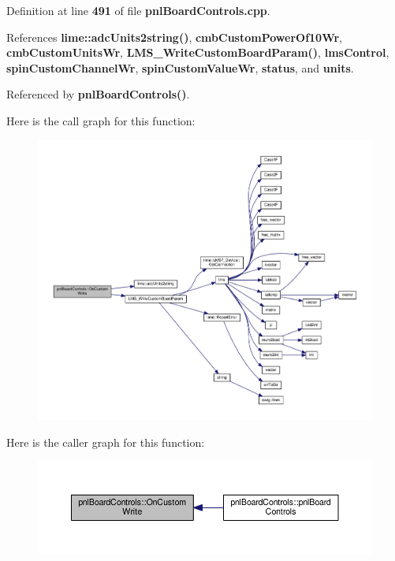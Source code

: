 Definition at line {\bf 491} of file {\bf pnl\+Board\+Controls.\+cpp}.



References {\bf lime\+::adc\+Units2string()}, {\bf cmb\+Custom\+Power\+Of10\+Wr}, {\bf cmb\+Custom\+Units\+Wr}, {\bf L\+M\+S\+\_\+\+Write\+Custom\+Board\+Param()}, {\bf lms\+Control}, {\bf spin\+Custom\+Channel\+Wr}, {\bf spin\+Custom\+Value\+Wr}, {\bf status}, and {\bf units}.



Referenced by {\bf pnl\+Board\+Controls()}.



Here is the call graph for this function\+:
\nopagebreak
\begin{figure}[H]
\begin{center}
\leavevmode
\includegraphics[width=350pt]{df/d93/classpnlBoardControls_a9218d64988342d65ec986628f2510965_cgraph}
\end{center}
\end{figure}




Here is the caller graph for this function\+:
\nopagebreak
\begin{figure}[H]
\begin{center}
\leavevmode
\includegraphics[width=350pt]{df/d93/classpnlBoardControls_a9218d64988342d65ec986628f2510965_icgraph}
\end{center}
\end{figure}


